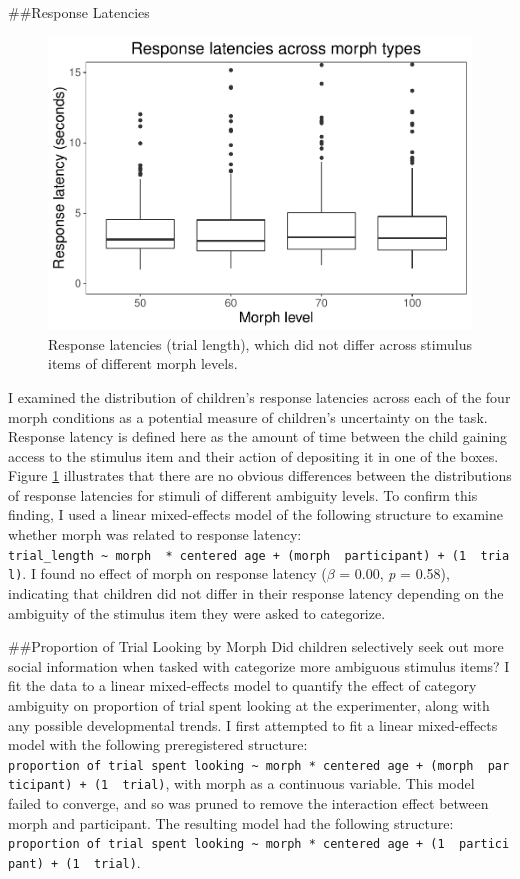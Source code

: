 \documentclass[,man,floatsintext]{apa6}
\begin{document}
\#\#Response Latencies

\begin{figure}
\centering
\includegraphics{soc_ref_category_paper_files/figure-latex/latencies-1.pdf}
\caption{\label{fig:latencies}Response latencies (trial length), which did not differ across stimulus items of different morph levels.}
\end{figure}

I examined the distribution of children's response latencies across each of the four morph conditions as a potential measure of children's uncertainty on the task. Response latency is defined here as the amount of time between the child gaining access to the stimulus item and their action of depositing it in one of the boxes. Figure \ref{fig:latencies} illustrates that there are no obvious differences between the distributions of response latencies for stimuli of different ambiguity levels. To confirm this finding, I used a linear mixed-effects model of the following structure to examine whether morph was related to response latency: \texttt{trial\_length\ \textasciitilde{}\ morph\ \ *\ centered\ age\ +\ (morph\ \textbar{}\ participant)\ +\ (1\ \textbar{}\ trial)}. I found no effect of morph on response latency (\(\beta\) = 0.00, \emph{p} = 0.58), indicating that children did not differ in their response latency depending on the ambiguity of the stimulus item they were asked to categorize.

\#\#Proportion of Trial Looking by Morph
Did children selectively seek out more social information when tasked with categorize more ambiguous stimulus items? I fit the data to a linear mixed-effects model to quantify the effect of category ambiguity on proportion of trial spent looking at the experimenter, along with any possible developmental trends. I first attempted to fit a linear mixed-effects model with the following preregistered structure: \texttt{proportion\ of\ trial\ spent\ looking\ \textasciitilde{}\ morph\ *\ centered\ age\ +\ (morph\ \textbar{}\ participant)\ +\ (1\ \textbar{}\ trial)}, with morph as a continuous variable. This model failed to converge, and so was pruned to remove the interaction effect between morph and participant. The resulting model had the following structure: \texttt{proportion\ of\ trial\ spent\ looking\ \textasciitilde{}\ morph\ *\ centered\ age\ +\ (1\ \textbar{}\ participant)\ +\ (1\ \textbar{}\ trial)}.
\end{document}
